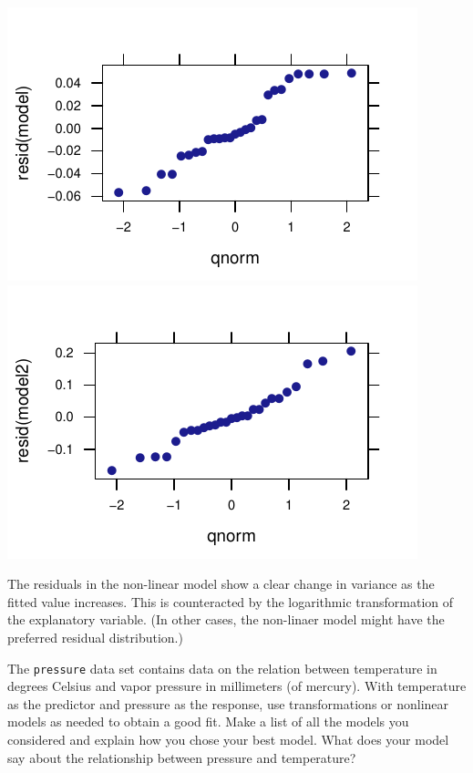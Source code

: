 \documentclass[twoside]{book}\usepackage[]{graphicx}\usepackage[]{xcolor}
\makeatletter
\def\maxwidth{ %
  \ifdim\Gin@nat@width>\linewidth
    \linewidth
  \else
    \Gin@nat@width
  \fi
}
\newenvironment{knitrout}{}{} %
\newcommand{\Rindex}[1]{\index{\texttt{#1}}}
\newcommand{\dataframe}[1]{{\color{blue!80!black}\texttt{#1}}\Rindex{#1}}
\makeatother
\begin{document}
\begin{solution}
\begin{knitrout}
{\centering \includegraphics[width=\maxwidth]{figures/fig-unnamed-chunk-213-1} 
\includegraphics[width=\maxwidth]{figures/fig-unnamed-chunk-213-2} 

}



\end{knitrout}
	
	The residuals in the non-linear model show a clear change 
	in variance as the fitted value increases.  This is counteracted by the logarithmic
	transformation of the explanatory variable.  (In other cases, the non-linaer model
	might have the preferred residual distribution.)
\end{solution}



\begin{problem}
The \dataframe{pressure} data set contains 
data on the relation between temperature in degrees Celsius and 
vapor pressure in millimeters (of mercury).
With temperature as the predictor and pressure as the response,
use transformations or nonlinear models as needed to obtain a good fit.
Make a list of all the models you considered and explain
how you chose your best model.
What does your model say about the relationship between 
pressure and temperature?
\end{problem}
\end{document}
